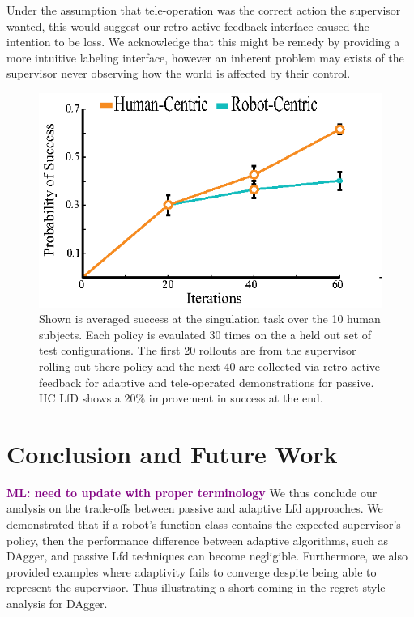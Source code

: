 \documentclass[10pt, conference]{ieeeconf}      %
\newcommand{\mlnote}[1]{\ifthenelse{ \boolean{include-notes}}%
 {\textcolor{purple}{\textbf{ML: #1}}}{}}
\begin{document}
 Under the assumption that tele-operation was the correct action the supervisor wanted, this would suggest our retro-active feedback interface caused the intention to be loss. We acknowledge that this might be remedy by providing a more intuitive labeling interface, however an inherent problem may exists of the supervisor never observing how the world is affected by their control. 

\begin{figure}
\centering
\includegraphics{f_figs/izzy_reward.eps}
\caption{
    \footnotesize
Shown is averaged success at the singulation task over the 10 human subjects. Each policy is evaulated 30 times on the a held out set of test configurations. The first 20 rollouts are from the supervisor rolling out there policy and the next 40 are collected via retro-active feedback for adaptive and tele-operated demonstrations for passive. HC LfD shows a 20$\%$ improvement in success at the end. }

\label{fig:izzy_rw}
\end{figure}


\section{Conclusion and Future Work}
\mlnote{need to update with proper terminology}
We thus conclude our analysis on the trade-offs between passive and adaptive Lfd approaches. We demonstrated that if a robot's function class contains the expected supervisor's policy, then the  performance difference between adaptive algorithms, such as DAgger,  and passive Lfd techniques can become negligible.  Furthermore, we also provided examples where adaptivity fails to converge despite being able to represent the supervisor. Thus illustrating a short-coming in the regret style analysis for DAgger. 
\end{document}
